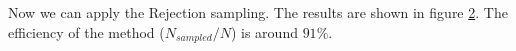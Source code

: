 \documentclass[../main.tex]{subfiles}
\begin{document}
\begin{figure}[ht!]
    \centerline{}
    \caption{}
    \label{fig: ex_2_1_comparison}
\end{figure}

Now we can apply the Rejection sampling. The results are shown in figure \ref{fig: ex_2_1_sampling}. The efficiency of the method ($N_{sampled}/N$) is around $91\%$.

\begin{figure}[ht!]
    \centerline{}
    \caption{}
    \label{fig: ex_2_1_sampling}
\end{figure}

%   
\end{document}
